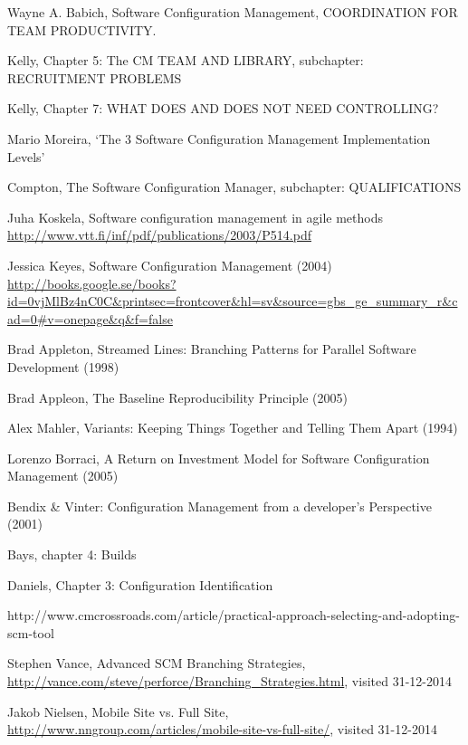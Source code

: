\documentclass[10pt]{article}
\begin{document}
\begin{thebibliography}{1}

 Wayne A. Babich, Software Configuration Management, COORDINATION FOR TEAM PRODUCTIVITY.

 Kelly, Chapter 5: The CM TEAM AND LIBRARY, subchapter: RECRUITMENT PROBLEMS 

 Kelly, Chapter 7: WHAT DOES AND DOES NOT NEED CONTROLLING? 

 Mario Moreira, ‘The 3 Software Configuration Management Implementation Levels’

Compton, The Software Configuration Manager, subchapter: QUALIFICATIONS

Juha Koskela, Software configuration management in agile methods
\url{http://www.vtt.fi/inf/pdf/publications/2003/P514.pdf}

 Jessica Keyes, Software Configuration Management (2004) \url{http://books.google.se/books?id=0vjMlBz4nC0C&printsec=frontcover&hl=sv&source=gbs_ge_summary_r&cad=0#v=onepage&q&f=false}

 Brad Appleton, Streamed Lines: Branching Patterns for Parallel Software Development (1998)

 Brad Appleon, The Baseline Reproducibility Principle (2005)

 Alex Mahler, Variants: Keeping Things Together and Telling Them Apart (1994)

 Lorenzo Borraci, A Return on Investment Model for Software Configuration Management (2005)

 Bendix \& Vinter: Configuration Management from a developer's Perspective (2001)

 Bays, chapter 4: Builds

 Daniels, Chapter 3: Configuration Identification

 http://www.cmcrossroads.com/article/practical-approach-selecting-and-adopting-scm-tool

 Stephen Vance, Advanced SCM Branching Strategies, \url{http://vance.com/steve/perforce/Branching_Strategies.html}, visited 31-12-2014

 Jakob Nielsen, Mobile Site vs. Full Site, \url{http://www.nngroup.com/articles/mobile-site-vs-full-site/}, visited 31-12-2014

\end{thebibliography}
\end{document}
